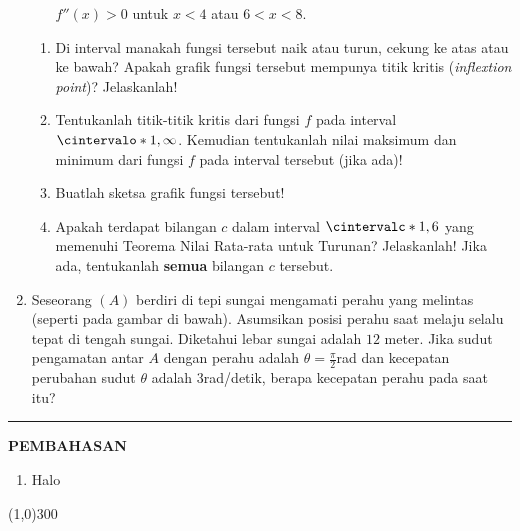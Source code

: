 \begin{enumerate}[leftmargin=*, label={\arabic*}.]
\begin{itemize}
    $f''(x)>0$ untuk $x<4$ atau $6 < x < 8$.
\end{itemize}
\begin{enumerate}[label={\alph*}.]
    \item Di interval manakah fungsi tersebut naik atau turun, cekung ke atas atau 
    ke bawah? Apakah grafik fungsi tersebut mempunya titik kritis 
    (\textit{inflextion point})? Jelaskanlah!
    \item Tentukanlah titik-titik kritis dari fungsi $f$ pada interval 
    $\cintervalo*{1,\infty}$. Kemudian tentukanlah nilai maksimum dan minimum dari fungsi $f$ 
    pada interval tersebut (jika ada)!
    \item Buatlah sketsa grafik fungsi tersebut!
    \item Apakah terdapat bilangan $c$ dalam interval $\cintervalc*{1,6}$ yang memenuhi 
    Teorema Nilai Rata-rata untuk Turunan? Jelaskanlah! Jika ada, tentukanlah \textbf{semua} 
    bilangan $c$ tersebut.
\end{enumerate}
\item Seseorang $(A)$ berdiri di tepi sungai mengamati perahu yang melintas (seperti pada 
gambar di bawah). Asumsikan posisi perahu saat melaju selalu tepat di tengah sungai. Diketahui 
lebar sungai adalah $12$ meter. Jika sudut pengamatan antar $A$ dengan perahu adalah 
$\theta =\frac{\pi}{2}$rad dan kecepatan perubahan sudut $\theta$ adalah $3$rad/detik, berapa 
kecepatan perahu pada saat itu?
\vspace{0.2cm}
\begin{center}
\end{center}
\end{enumerate}
\vspace{0.2cm}
\hrule height 1pt
\vspace{0.5cm}
\begin{center}
    \textbf{\large{PEMBAHASAN}}
\end{center}
\begin{enumerate}[leftmargin=*, label={\arabic*}.]
\item Halo

\end{enumerate}

\begin{center}
    \line(1,0){300}
\end{center}